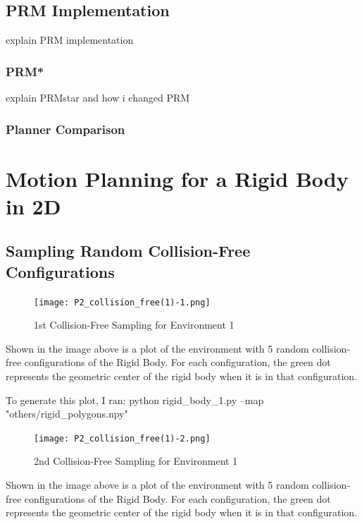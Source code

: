 \documentclass{article}
\begin{document}
\subsection{PRM Implementation}
explain PRM implementation
\subsubsection{PRM*}
explain PRMstar and how i changed PRM
\subsubsection{Planner Comparison}
\maketitle
\section{Motion Planning for a Rigid Body in 2D}
\subsection{Sampling Random Collision-Free Configurations}
\begin{figure}[h!]
	\texttt{[image: P2\_collision\_free(1)-1.png]}
	\centering
	\caption{1st Collision-Free Sampling for Environment 1}
	\label{P2_collision_free(1)-1.png}
\end{figure}

Shown in the image above is a plot of the environment with 5 random collision-free configurations of the Rigid Body. For each configuration, the green dot represents the geometric center of the rigid body when it is in that configuration. \newline 

To generate this plot, I ran: \newline 
python rigid\_body\_1.py --map "others/rigid\_polygons.npy"


\newpage 
\begin{figure}[h!]
	\texttt{[image: P2\_collision\_free(1)-2.png]}
	\centering
	\caption{2nd Collision-Free Sampling for Environment 1}
	\label{P2_collision_free(1)-2.png}
\end{figure}
Shown in the image above is a plot of the environment with 5 random collision-free configurations of the Rigid Body. For each configuration, the green dot represents the geometric center of the rigid body when it is in that configuration. \newline 
\end{document}
